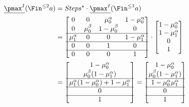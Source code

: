 \begin{align*}
	\underline{\pmax^I}(\Fin^{\le 2} a) & = Steps^\star \cdot \underline{\pmax^I}(\Fin^{\le 1} a)       \\
	                                    & = \begin{bmatrix}
		                                        0            & 0           & \mu_0^\alpha  & 1-\mu_0^\alpha \\
		                                        0            & \mu_0^\beta & 1-\mu_0^\beta & 0              \\
		                                        \hline
		                                        \mu_1^\alpha & 0           & 0             & 1-\mu_1^\alpha \\
		                                        \hline
		                                        0            & 0           & 1             & 0              \\
		                                        \hline
		                                        0            & 0           & 0             & 1              \\
	                                        \end{bmatrix} \cdot \begin{bmatrix}
		                                                            1-\mu_0^\alpha   \\
		                                                            1 - \mu_1^\alpha \\
		                                                            0                \\
		                                                            1
	                                                            \end{bmatrix} \\
	                                    & = \begin{bmatrix}
		                                        1 - \mu_0^\alpha                              \\
		                                        \mu_0^\beta(1 - \mu_1^\alpha)                 \\
		                                        \hline
		                                        \mu_1^\alpha(1-\mu_0^\alpha) + 1-\mu_1^\alpha \\
		                                        \hline
		                                        0                                             \\
		                                        \hline
		                                        1
	                                        \end{bmatrix}
	= \begin{bmatrix}
		  1 - \mu_0^\alpha              \\
		  \mu_0^\beta(1 - \mu_1^\alpha) \\
		  \hline
		  1 - \mu_0^\alpha \mu_1^\alpha \\
		  \hline
		  0                             \\
		  \hline
		  1
	  \end{bmatrix}
\end{align*}

